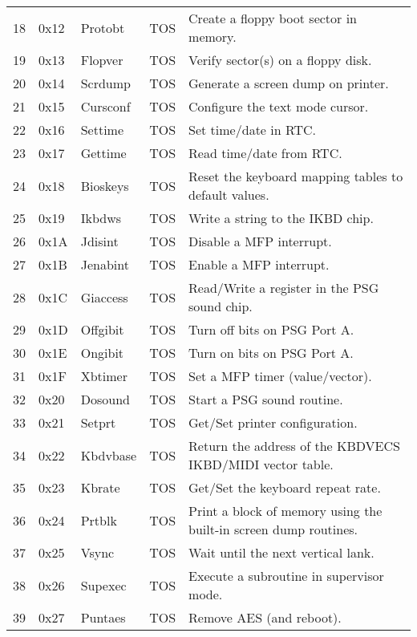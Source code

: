 \documentclass[a4paper]{article}
\begin{document}
\begin{supertabular}{|p{0.7cm}|p{1.1cm}|p{4.0cm}|p{1cm}|p{7.8cm}|}
18      & 0x12  & Protobt     & TOS   & Create a floppy boot sector in memory. \\
19      & 0x13  & Flopver     & TOS   & Verify sector(s) on a floppy disk. \\
20      & 0x14  & Scrdump     & TOS   & Generate a screen dump on printer. \\
21      & 0x15  & Cursconf    & TOS   & Configure the text mode cursor. \\
22      & 0x16  & Settime     & TOS   & Set time$/$date in RTC. \\
23      & 0x17  & Gettime     & TOS   & Read time$/$date from RTC. \\
24      & 0x18  & Bioskeys    & TOS   & Reset the keyboard mapping tables to default values. \\
25      & 0x19  & Ikbdws      & TOS   & Write a string to the IKBD chip. \\
26      & 0x1A  & Jdisint     & TOS   & Disable a MFP interrupt. \\
27      & 0x1B  & Jenabint    & TOS   & Enable a MFP interrupt. \\
28      & 0x1C  & Giaccess    & TOS   & Read$/$Write a register in the PSG sound chip. \\
29      & 0x1D  & Offgibit    & TOS   & Turn off bits on PSG Port A. \\
30      & 0x1E  & Ongibit     & TOS   & Turn on bits on PSG Port A. \\
31      & 0x1F  & Xbtimer     & TOS   & Set a MFP timer (value$/$vector). \\
32      & 0x20  & Dosound     & TOS   & Start a PSG sound routine. \\
33      & 0x21  & Setprt      & TOS   & Get$/$Set printer configuration. \\
34      & 0x22  & Kbdvbase    & TOS   & Return the address of the KBDVECS IKBD/MIDI vector table. \\
35      & 0x23  & Kbrate      & TOS   & Get$/$Set the keyboard repeat rate. \\
36      & 0x24  & Prtblk      & TOS   & Print a block of memory using the built-in screen dump routines. \\
37      & 0x25  & Vsync       & TOS   & Wait until the next vertical lank. \\
38      & 0x26  & Supexec     & TOS   & Execute a subroutine in supervisor mode. \\
39      & 0x27  & Puntaes     & TOS   & Remove AES (and reboot). \\

\end{supertabular}
\end{document}

